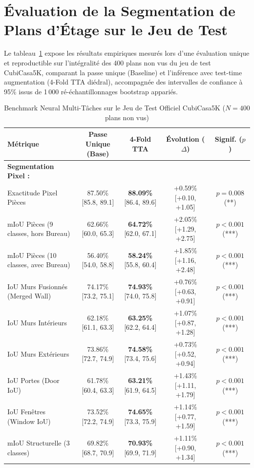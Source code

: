 \documentclass[11pt,a4paper]{report}
\begin{document}
\section{Évaluation de la Segmentation de Plans d'Étage sur le Jeu de Test}
Le tableau~\ref{tab:floorplan_benchmark} expose les résultats empiriques mesurés lors d'une évaluation unique et reproductible sur l'intégralité des 400 plans non vus du jeu de test CubiCasa5K, comparant la passe unique (Baseline) et l'inférence avec test-time augmentation (4-Fold TTA diédral), accompagnée des intervalles de confiance à 95\% issus de 1\,000 ré-échantillonnages bootstrap appariés.

\begin{table}[H]
\centering
\caption{Benchmark Neural Multi-Tâches sur le Jeu de Test Officiel CubiCasa5K ($N = 400$ plans non vus)}
\label{tab:floorplan_benchmark}
\small
\begin{tabular}{lcccc}
\toprule
\textbf{Métrique} & \textbf{Passe Unique (Base)} & \textbf{4-Fold TTA} & \textbf{Évolution ($\Delta$)} & \textbf{Signif. ($p$)} \\
\midrule
\textbf{Segmentation Pixel :} & & & & \\
Exactitude Pixel Pièces & 87.50\% [85.8, 89.1] & \textbf{88.09\%} [86.4, 89.6] & +0.59\% [+0.10, +1.05] & $p = 0.008$ (**) \\
mIoU Pièces (9 classes, hors Bureau) & 62.66\% [60.0, 65.3] & \textbf{64.72\%} [62.0, 67.1] & +2.05\% [+1.29, +2.75] & $p < 0.001$ (***) \\
mIoU Pièces (10 classes, avec Bureau) & 56.40\% [54.0, 58.8] & \textbf{58.24\%} [55.8, 60.4] & +1.85\% [+1.16, +2.48] & $p < 0.001$ (***) \\
IoU Murs Fusionnés (Merged Wall) & 74.17\% [73.2, 75.1] & \textbf{74.93\%} [74.0, 75.8] & +0.76\% [+0.63, +0.91] & $p < 0.001$ (***) \\
IoU Murs Intérieurs & 62.18\% [61.1, 63.3] & \textbf{63.25\%} [62.2, 64.4] & +1.07\% [+0.87, +1.28] & $p < 0.001$ (***) \\
IoU Murs Extérieurs & 73.86\% [72.7, 74.9] & \textbf{74.58\%} [73.4, 75.6] & +0.73\% [+0.52, +0.94] & $p < 0.001$ (***) \\
IoU Portes (Door IoU) & 61.78\% [60.4, 63.3] & \textbf{63.21\%} [61.9, 64.5] & +1.43\% [+1.11, +1.79] & $p < 0.001$ (***) \\
IoU Fenêtres (Window IoU) & 73.52\% [72.2, 74.9] & \textbf{74.65\%} [73.3, 75.9] & +1.14\% [+0.77, +1.59] & $p < 0.001$ (***) \\
mIoU Structurelle (3 classes) & 69.82\% [68.7, 70.9] & \textbf{70.93\%} [69.9, 71.9] & +1.11\% [+0.90, +1.34] & $p < 0.001$ (***) \\

\end{tabular}
\end{table}
\end{document}
